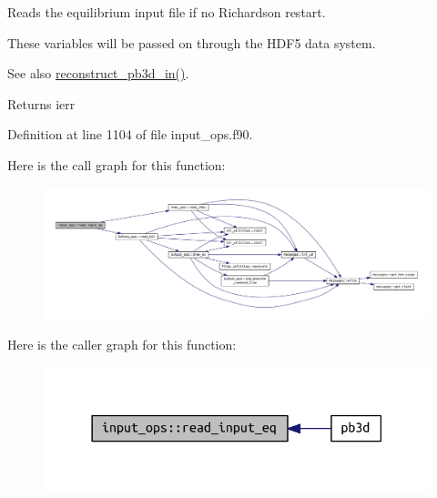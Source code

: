 Reads the equilibrium input file if no Richardson restart. 

These variables will be passed on through the H\+D\+F5 data system.

\begin{DoxySeeAlso}{See also}
\hyperlink{namespacepb3d__ops_ad1481747b9b9832f816d4bf1dd2d6737}{reconstruct\+\_\+pb3d\+\_\+in()}.
\end{DoxySeeAlso}
\begin{DoxyReturn}{Returns}
ierr 
\end{DoxyReturn}


Definition at line 1104 of file input\+\_\+ops.\+f90.

Here is the call graph for this function\+:\nopagebreak
\begin{figure}[H]
\begin{center}
\leavevmode
\includegraphics[width=350pt]{namespaceinput__ops_a577c897cc266961eb40bb5ef747fa077_cgraph}
\end{center}
\end{figure}
Here is the caller graph for this function\+:\nopagebreak
\begin{figure}[H]
\begin{center}
\leavevmode
\includegraphics[width=318pt]{namespaceinput__ops_a577c897cc266961eb40bb5ef747fa077_icgraph}
\end{center}
\end{figure}
\mbox{\label{namespaceinput__ops_a434acca4f59f9dc1d91e04f846133684}} 
